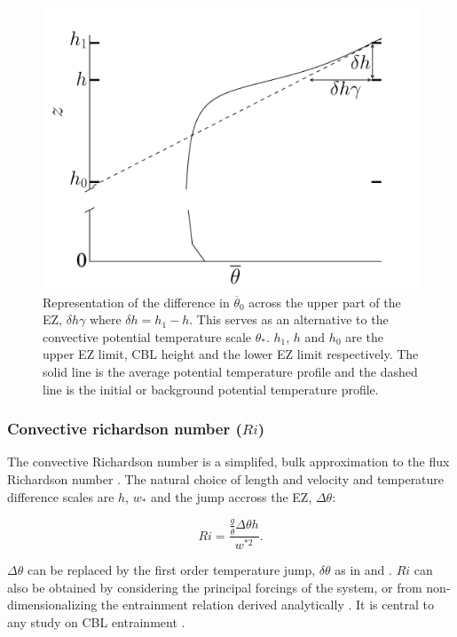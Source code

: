 \begin{figure}[htbp]
    \centering
    \includegraphics[scale=.32]{figures/deltah_gamma.pdf}
    \caption[Alternative Potential Temperature Scale for the EZ]{Representation of the difference in $\overline{\theta}_{0}$ across the upper part of the EZ, $\delta h \gamma$ where $\delta h = h_{1} - h$. This serves as an alternative to the convective potential temperature scale $\theta_{*}$. $h_{1}$, $h$ and $h_{0}$ are the upper EZ limit, CBL height and the lower EZ limit respectively. The solid line is the average potential temperature profile and the dashed line is the initial or background potential temperature profile.}
    \label{fig:deltahgamma}   %
\end{figure}

\subsubsection{Convective richardson number ($Ri$)}
\label{subsubsec:}


The convective Richardson number is a simplifed, bulk approximation to the flux Richardson number \citep{Stull-BLMetIntro}.  The natural choice of length and velocity and temperature difference scales are $h$, $w_{*}$ and the jump accross the EZ, $\Delta \theta$:

\begin{equation}
Ri = \frac{\frac{g}{\overline{\theta}} \Delta \theta h}{w^{*2}}.
\end{equation}

$\Delta \theta$ can be replaced by the first order temperature jump, $\delta \theta$ as in \cite{FedConzMir04} and \cite{GarciaMellado}.  $Ri$ can also be obtained by considering the principal forcings of the system, or from non-dimensionalizing the entrainment relation derived analytically \citep{Tennekes73, Deardorff72}. It is central to any study on CBL entrainment \citep{SullMoengStev, FedConzMir04, Traum11, BrooksFowler2}.

